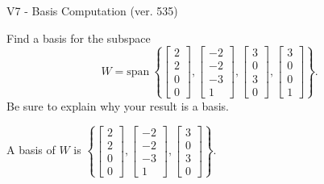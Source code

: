 \begin{exercise}
  \begin{exerciseTitle}V7 - Basis Computation (ver. 535)\end{exerciseTitle}
  \begin{exerciseStatement}
    Find a basis for the subspace 
\[W=\mathrm{span}\ \left\{\left[\begin{array}{r}
2 \\
2 \\
0 \\
0
\end{array}\right] , \left[\begin{array}{r}
-2 \\
-2 \\
-3 \\
1
\end{array}\right] , \left[\begin{array}{r}
3 \\
0 \\
3 \\
0
\end{array}\right] , \left[\begin{array}{r}
3 \\
0 \\
0 \\
1
\end{array}\right]\right\}.\]
 Be sure to explain why your result is a basis.


  \end{exerciseStatement}
  \begin{exerciseAnswer}
   A basis of \(W\) is  \(\left\{\left[\begin{array}{r}
2 \\
2 \\
0 \\
0
\end{array}\right] , \left[\begin{array}{r}
-2 \\
-2 \\
-3 \\
1
\end{array}\right] , \left[\begin{array}{r}
3 \\
0 \\
3 \\
0
\end{array}\right]\right\}\).
  


  \end{exerciseAnswer}
\end{exercise}